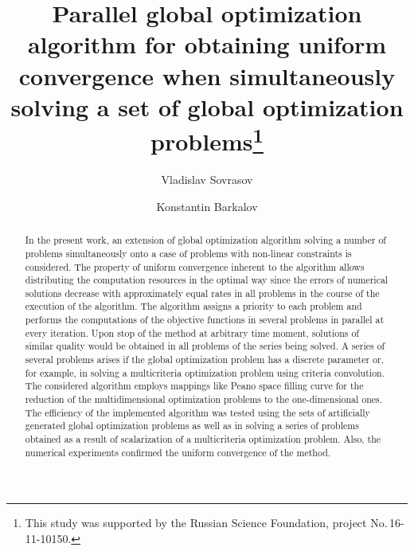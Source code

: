 \documentclass[runningheads]{llncs}
\begin{document}
%
\title{Parallel global optimization algorithm for obtaining uniform convergence when
simultaneously solving a set of global optimization problems\thanks{This study was supported
by the Russian Science Foundation, project No.\,16-11-10150.}}
%
%
\author{Vladislav Sovrasov\and
Konstantin Barkalov
}
%
%
%
\maketitle              %
%
\begin{abstract}
In the present work, an extension of global optimization algorithm solving a number of problems
simultaneously onto a case of problems with non-linear constraints is considered. The property
of uniform convergence inherent to the algorithm allows distributing the computation resources
in the optimal way since the errors of numerical solutions decrease with approximately equal
rates in all problems in the course of the execution of the algorithm. The algorithm assigns a
priority to each problem and performs the computations of the objective functions in several
problems in parallel at every iteration. Upon stop of the method at arbitrary time moment,
solutions of similar quality would be obtained in all problems of the series being solved. A series
of several problems arises if the global optimization problem has a discrete parameter or, for
example, in solving a multicriteria optimization problem using criteria convolution. The
considered algorithm employs mappings like Peano space filling curve for the reduction of the
multidimensional optimization problems to the one-dimensional ones.  The efficiency of the
implemented algorithm was tested using the sets of artificially generated global optimization
problems as well as in solving a series of problems obtained as a result of scalarization of a
multicriteria optimization  problem. Also, the numerical experiments confirmed the uniform
convergence of the method.

\end{abstract}
%
%
%
\end{document}
